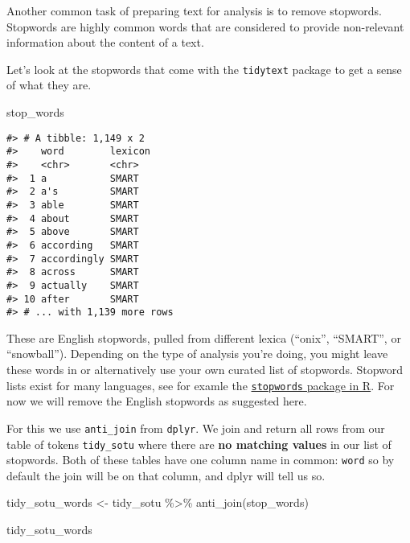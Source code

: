 \documentclass[
]{book}
\newenvironment{Shaded}{\begin{snugshade}}{\end{snugshade}}
\newcommand{\FunctionTok}[1]{\textcolor[rgb]{0.00,0.00,0.00}{#1}}
\newcommand{\NormalTok}[1]{#1}
\newcommand{\OtherTok}[1]{\textcolor[rgb]{0.56,0.35,0.01}{#1}}
\newcommand{\SpecialCharTok}[1]{\textcolor[rgb]{0.00,0.00,0.00}{#1}}
\begin{document}
Another common task of preparing text for analysis is to remove stopwords. Stopwords are highly common words that are considered to provide non-relevant information about the content of a text.

Let's look at the stopwords that come with the \texttt{tidytext} package to get a sense of what they are.

\begin{Shaded}
\begin{Highlighting}[]
\NormalTok{stop\_words}
\end{Highlighting}
\end{Shaded}

\begin{verbatim}
#> # A tibble: 1,149 x 2
#>    word        lexicon
#>    <chr>       <chr>  
#>  1 a           SMART  
#>  2 a's         SMART  
#>  3 able        SMART  
#>  4 about       SMART  
#>  5 above       SMART  
#>  6 according   SMART  
#>  7 accordingly SMART  
#>  8 across      SMART  
#>  9 actually    SMART  
#> 10 after       SMART  
#> # ... with 1,139 more rows
\end{verbatim}

These are English stopwords, pulled from different lexica (``onix'', ``SMART'', or ``snowball''). Depending on the type of analysis you're doing, you might leave these words in or alternatively use your own curated list of stopwords. Stopword lists exist for many languages, see for examle the \href{https://cran.r-project.org/package=stopwords}{\texttt{stopwords} package in R}. For now we will remove the English stopwords as suggested here.

For this we use \texttt{anti\_join} from \texttt{dplyr}. We join and return all rows from our table of tokens \texttt{tidy\_sotu} where there are \textbf{no matching values} in our list of stopwords. Both of these tables have one column name in common: \texttt{word} so by default the join will be on that column, and dplyr will tell us so.

\begin{Shaded}
\begin{Highlighting}[]
\NormalTok{tidy\_sotu\_words }\OtherTok{\textless{}{-}}\NormalTok{ tidy\_sotu }\SpecialCharTok{\%\textgreater{}\%} 
  \FunctionTok{anti\_join}\NormalTok{(stop\_words)}

\NormalTok{tidy\_sotu\_words}
\end{Highlighting}
\end{Shaded}
\end{document}
